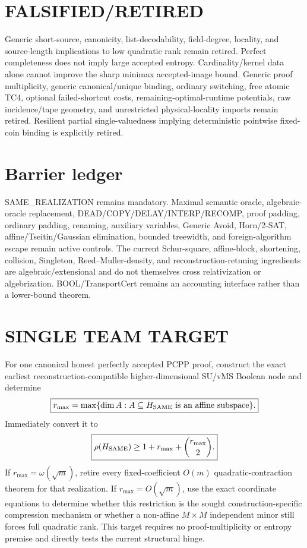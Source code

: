 \documentclass[11pt]{article}
\begin{document}
\section*{FALSIFIED/RETIRED}
Generic short-source, canonicity, list-decodability, field-degree, locality, and source-length implications to low quadratic rank remain retired. Perfect completeness does not imply large accepted entropy. Cardinality/kernel data alone cannot improve the sharp minimax accepted-image bound. Generic proof multiplicity, generic canonical/unique binding, ordinary switching, free atomic TC4, optional failed-shortcut costs, remaining-optimal-runtime potentials, raw incidence/tape geometry, and unrestricted physical-locality imports remain retired. Resilient partial single-valuedness implying deterministic pointwise fixed-coin binding is explicitly retired.

\section*{Barrier ledger}
SAME\_REALIZATION remains mandatory. Maximal semantic oracle, algebraic-oracle replacement, DEAD/COPY/DELAY/INTERP/RECOMP, proof padding, ordinary padding, renaming, auxiliary variables, Generic Avoid, Horn/2-SAT, affine/Tseitin/Gaussian elimination, bounded treewidth, and foreign-algorithm escape remain active controls. The current Schur-square, affine-block, shortening, collision, Singleton, Reed--Muller-density, and reconstruction-retuning ingredients are algebraic/extensional and do not themselves cross relativization or algebrization. BOOL/TransportCert remains an accounting interface rather than a lower-bound theorem.

\section*{SINGLE TEAM TARGET}
For one canonical honest perfectly accepted PCPP proof, construct the exact earliest reconstruction-compatible higher-dimensional SU/vMS Boolean node and determine
\[ \boxed{r_{\max}=\max\{\dim A:A\subseteq H_{\rm SAME}\text{ is an affine subspace}\}.} \]
Immediately convert it to
\[ \boxed{\rho(H_{\rm SAME})\ge 1+r_{\max}+\binom{r_{\max}}2.} \]
If \(r_{\max}=\omega(\sqrt m)\), retire every fixed-coefficient \(O(m)\) quadratic-contraction theorem for that realization. If \(r_{\max}=O(\sqrt m)\), use the exact coordinate equations to determine whether this restriction is the sought construction-specific compression mechanism or whether a non-affine \(M\times M\) independent minor still forces full quadratic rank. This target requires no proof-multiplicity or entropy premise and directly tests the current structural hinge.
\end{document}
